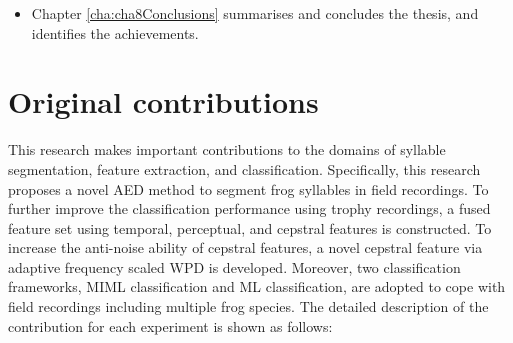 \begin{itemize}


\item  Chapter \ref{cha:cha8Conclusions} summarises and concludes the thesis, and identifies the achievements.

\end{itemize}

\section{Original contributions}
This research makes important contributions to the domains of syllable segmentation, feature extraction, and classification. Specifically, this research proposes a novel AED method to segment frog syllables in field recordings. To further improve the classification performance using trophy recordings, a fused feature set using temporal, perceptual, and cepstral features is constructed. To increase the anti-noise ability of cepstral features, a novel cepstral feature via adaptive frequency scaled WPD is developed. Moreover, two classification frameworks, MIML classification and ML classification, are adopted to cope with field recordings including multiple frog species. The detailed description of the contribution for each experiment is shown as follows:

